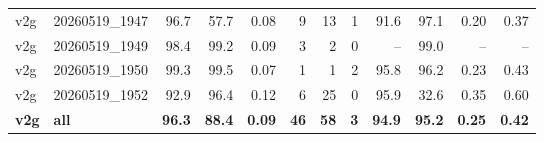 \begin{table}[t]
\begin{tabular}{llrrrrrrrrrr}
v2g & 20260519\_1947 & 96.7 & 57.7 & 0.08 & 9 & 13 & 1 & 91.6 & 97.1 & 0.20 & 0.37 \\
v2g & 20260519\_1949 & 98.4 & 99.2 & 0.09 & 3 & 2 & 0 & -- & 99.0 & -- & -- \\
v2g & 20260519\_1950 & 99.3 & 99.5 & 0.07 & 1 & 1 & 2 & 95.8 & 96.2 & 0.23 & 0.43 \\
v2g & 20260519\_1952 & 92.9 & 96.4 & 0.12 & 6 & 25 & 0 & 95.9 & 32.6 & 0.35 & 0.60 \\
\textbf{v2g} & \textbf{all} & \textbf{96.3} & \textbf{88.4} & \textbf{0.09} & \textbf{46} & \textbf{58} & \textbf{3} & \textbf{94.9} & \textbf{95.2} & \textbf{0.25} & \textbf{0.42} \\
\bottomrule
\end{tabular}
\end{table}
